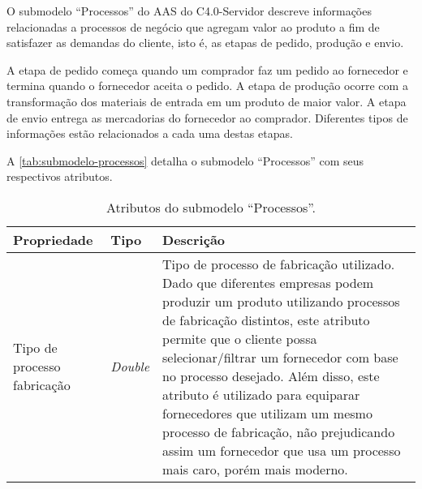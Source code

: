 O submodelo ``Processos'' do AAS do C4.0-Servidor descreve informações relacionadas a processos de negócio que agregam valor ao produto a fim de satisfazer as demandas do cliente, isto é, as etapas de pedido, produção e envio.

A etapa de pedido começa quando um comprador faz um pedido ao fornecedor e termina quando o fornecedor aceita o pedido. A etapa de produção ocorre com a transformação dos materiais de entrada em um produto de maior valor. A etapa de envio entrega as mercadorias do fornecedor ao comprador. Diferentes tipos de informações estão relacionados a cada uma destas etapas.

A \autoref{tab:submodelo-processos} detalha o submodelo ``Processos'' com seus respectivos atributos.

\begin{longtable}{p{} p{} p{}}
	\caption{Atributos do submodelo ``Processos''.}                                                                                                                                                                                                                                                                                                                                                                                                                                                                                                                                                                                                                   \\

	\hline
	\textbf{Propriedade}
	 & \textbf{Tipo}
	 & \textbf{Descrição}                                                                                                                                                                                                                                                                                                                                                                                                                                                                                                                                                                                                                                             \\



	\hline
	Tipo de processo fabricação
	 & \textit{Double}
	 & Tipo de processo de fabricação utilizado. Dado que diferentes empresas podem produzir um produto utilizando processos de fabricação distintos, este atributo permite que o cliente possa selecionar/filtrar um fornecedor com base no processo desejado. Além disso, este atributo é utilizado para equiparar fornecedores que utilizam um mesmo processo de fabricação, não prejudicando assim um fornecedor que usa um processo mais caro, porém mais moderno.                                                                                                                                                                                               \\


\end{longtable}
